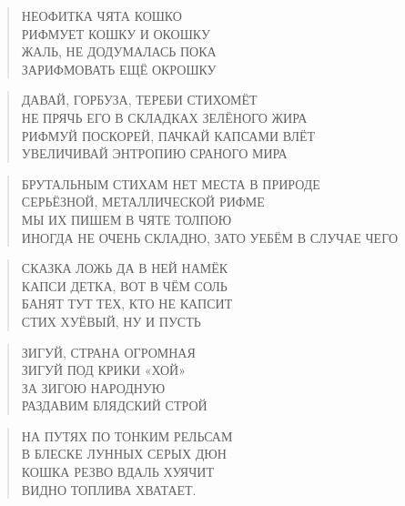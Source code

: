 \poemtitle{***}
\begin{verse}
НЕОФИТКА ЧЯТА КОШКО\\
РИФМУЕТ КОШКУ И ОКОШКУ\\
ЖАЛЬ, НЕ ДОДУМАЛАСЬ ПОКА\\
ЗАРИФМОВАТЬ ЕЩЁ ОКРОШКУ
\end{verse}

\poemtitle{***}
\begin{verse}
ДАВАЙ, ГОРБУЗА, ТЕРЕБИ СТИХОМЁТ\\
НЕ ПРЯЧЬ ЕГО В СКЛАДКАХ ЗЕЛЁНОГО ЖИРА\\
РИФМУЙ ПОСКОРЕЙ, ПАЧКАЙ КАПСАМИ ВЛЁТ\\
УВЕЛИЧИВАЙ ЭНТРОПИЮ СРАНОГО МИРА
\end{verse}

\poemtitle{***}
\begin{verse}
БРУТАЛЬНЫМ СТИХАМ НЕТ МЕСТА В ПРИРОДЕ\\
СЕРЬЁЗНОЙ, МЕТАЛЛИЧЕСКОЙ РИФМЕ \\
МЫ ИХ ПИШЕМ В ЧЯТЕ ТОЛПОЮ\\
ИНОГДА НЕ ОЧЕНЬ СКЛАДНО, ЗАТО УЕБЁМ В СЛУЧАЕ ЧЕГО
\end{verse}

\poemtitle{***}
\begin{verse}
СКАЗКА ЛОЖЬ ДА В НЕЙ НАМЁК\\
КАПСИ ДЕТКА, ВОТ В ЧЁМ СОЛЬ\\
БАНЯТ ТУТ ТЕХ, КТО НЕ КАПСИТ\\
СТИХ ХУЁВЫЙ, НУ И ПУСТЬ
\end{verse}

\poemtitle{***}
\begin{verse}
ЗИГУЙ, СТРАНА ОГРОМНАЯ\\
ЗИГУЙ ПОД КРИКИ «ХОЙ»\\
ЗА ЗИГОЮ НАРОДНУЮ\\
РАЗДАВИМ БЛЯДСКИЙ СТРОЙ
\end{verse}

\poemtitle{***}
\begin{verse}
НА ПУТЯХ ПО ТОНКИМ РЕЛЬСАМ\\
В БЛЕСКЕ ЛУННЫХ СЕРЫХ ДЮН\\
КОШКА РЕЗВО ВДАЛЬ ХУЯЧИТ\\
ВИДНО ТОПЛИВА ХВАТАЕТ.
\end{verse}

